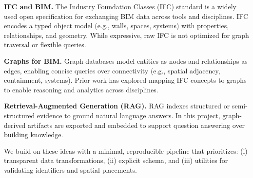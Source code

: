 \textbf{IFC and BIM.} The Industry Foundation Classes (IFC) standard is a widely used open specification for exchanging BIM data across tools and disciplines. IFC encodes a typed object model (e.g., walls, spaces, systems) with properties, relationships, and geometry. While expressive, raw IFC is not optimized for graph traversal or flexible queries.

\textbf{Graphs for BIM.} Graph databases model entities as nodes and relationships as edges, enabling concise queries over connectivity (e.g., spatial adjacency, containment, systems). Prior work has explored mapping IFC concepts to graphs to enable reasoning and analytics across disciplines.

\textbf{Retrieval-Augmented Generation (RAG).} RAG indexes structured or semi-structured evidence to ground natural language answers. In this project, graph-derived artifacts are exported and embedded to support question answering over building knowledge.

We build on these ideas with a minimal, reproducible pipeline that prioritizes: (i) transparent data transformations, (ii) explicit schema, and (iii) utilities for validating identifiers and spatial placements.

